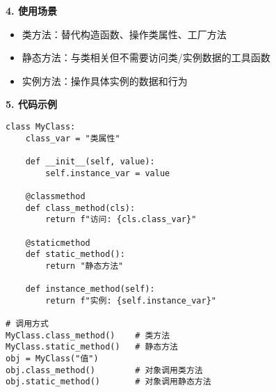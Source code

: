 \begin{mdframed}[linewidth=1pt, linecolor=black]
    \textbf{4. 使用场景}
    \begin{itemize}
      \item 类方法：替代构造函数、操作类属性、工厂方法
      \item 静态方法：与类相关但不需要访问类/实例数据的工具函数
      \item 实例方法：操作具体实例的数据和行为
    \end{itemize}

    \textbf{5. 代码示例}
    \begin{lstlisting}[linewidth=\textwidth, breaklines=true, numbers=none]
class MyClass:
    class_var = "类属性"

    def __init__(self, value):
        self.instance_var = value

    @classmethod
    def class_method(cls):
        return f"访问: {cls.class_var}"

    @staticmethod
    def static_method():
        return "静态方法"

    def instance_method(self):
        return f"实例: {self.instance_var}"

# 调用方式
MyClass.class_method()    # 类方法
MyClass.static_method()   # 静态方法
obj = MyClass("值")
obj.class_method()        # 对象调用类方法
obj.static_method()       # 对象调用静态方法
    \end{lstlisting}
  \end{mdframed}